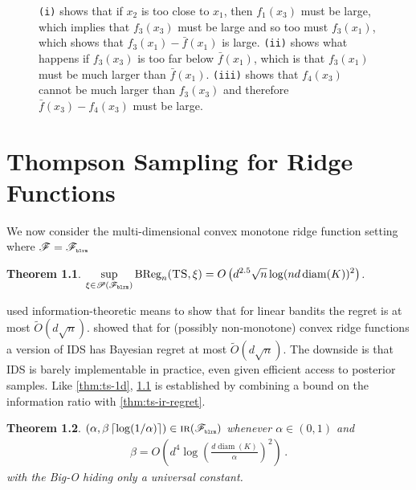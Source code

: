 \documentclass[letter, 12pt]{report}
\newcommand{\pr}{\text{\tiny\texttt{r}}}
\newcommand{\pb}{\text{\tiny\texttt{b}}}
\newcommand{\pl}{\text{\tiny\texttt{l}}}
\renewcommand{\pm}{\text{\tiny\texttt{m}}}
\newcommand{\ceil}[1]{\left\lceil #1 \right\rceil}
\newcommand{\BReg}{\textrm{BReg}}
\newcommand{\sF}{\mathscr F}
\newcommand{\sP}{\mathscr P}
\newcommand{\diam}{\operatorname{diam}}
\newcommand{\1}{\mathbf{1}}
\newcommand{\IR}{\operatorname{\textsc{ir}}}
\newcommand{\ts}{\textsc{TS}\xspace}
\newcommand{\IDS}{\textsc{IDS}}
\theoremstyle{plain}
\newtheorem{theorem}{Theorem}
\theoremstyle{definition}
\theoremstyle{remark}
\begin{document}
\begin{figure}[h!]

    \caption{
        \texttt{(i)} shows that if $x_2$ is too close to $x_1$, then $f_1(x_3)$ must be large, which implies that $f_3(x_3)$ must be large
        and so too must $f_3(x_1)$, which shows that $f_3(x_1) - \bar f(x_1)$ is large.
        \texttt{(ii)} shows what happens if $f_3(x_3)$ is too far below $\bar f(x_1)$, which is that $f_3(x_1)$ must be much larger than $\bar f(x_1)$.
        \texttt{(iii)} shows that $f_4(x_3)$ cannot be much larger than $f_3(x_3)$ and therefore $\bar f(x_3) - f_4(x_3)$ must be large.
    }
    \label{fig:ts}
\end{figure}

\chapter{Thompson Sampling for Ridge Functions}

We now consider the multi-dimensional convex monotone ridge function setting where $\sF = \sF_{\pb\pl\pr\pm}$

\begin{theorem}\label{thm:ts-ridge}
    $\displaystyle \sup_{\xi \in \sP(\sF_{\pb\pl\pr\pm})} \BReg_n(\ts, \xi) = O\left(d^{2.5} \sqrt{n} \log(n d \diam(K))^2\right)$.
\end{theorem}

\cite{RV16} used information-theoretic means to show that for linear bandits the regret is at most $\tilde O(d \sqrt{n})$.
\cite{lattimore2021minimax} showed that for (possibly non-monotone) convex ridge functions a version of \IDS{} has Bayesian regret at most $\tilde O(d \sqrt{n})$.
The downside is that \IDS{} is barely implementable in practice, even given efficient access to posterior samples.
Like \cref{thm:ts-1d}, \cref{thm:ts-ridge} is established by combining a bound on the information ratio with \cref{thm:ts-ir-regret}.

\begin{theorem}\label{thm:ridge-ir}
    $(\alpha, \beta \ceil{\log(1/\alpha)}) \in \IR(\sF_{\pb\pl\pr\pm})$ whenever $\alpha \in (0,1)$ and
    \begin{align*}
        \beta = O\left(d^4 \log\left(\frac{d \diam(K)}{\alpha}\right)^2\right) \,.
    \end{align*}
    with the Big-O hiding only a universal constant.
\end{theorem}
\end{document}
